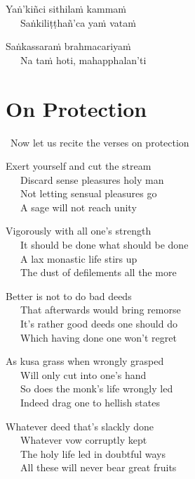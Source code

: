 \begin{hanging-indent}
Yaṅ'kiñci sithilaṁ kammaṁ\\
Saṅkiliṭṭhañ'ca yaṁ vataṁ
\end{hanging-indent}

\begin{hanging-indent}
Saṅkassaraṁ brahmacariyaṁ\\
Na taṁ hoti, mahapphalan'ti
\end{hanging-indent}

\suttaRef{[SN 2.8]}

\clearpage



\section{On Protection}
\label{tayana-gatha-english}

\begin{intro}
	\anglebracketleft\ \hspace{-0.5mm}Now let us recite the verses on protection \hspace{-0.5mm}\anglebracketright\
\end{intro}

\begin{hanging-indent}
Exert yourself and cut the stream\\
Discard sense pleasures holy man\\
Not letting sensual pleasures go\\
A sage will not reach unity
\end{hanging-indent}

\begin{hanging-indent}
Vigorously with all one's strength\\
It should be done what should be done\\
A lax monastic life stirs up\\
The dust of defilements all the more
\end{hanging-indent}

\begin{hanging-indent}
Better is not to do bad deeds\\
That afterwards would bring remorse\\
It's rather good deeds one should do\\
Which having done one won't regret
\end{hanging-indent}

\begin{hanging-indent}
As kusa grass when wrongly grasped\\
Will only cut into one's hand\\
So does the monk's life wrongly led\\
Indeed drag one to hellish states
\end{hanging-indent}

\begin{hanging-indent}
Whatever deed that's slackly done\\
Whatever vow corruptly kept\\
The holy life led in doubtful ways\\
All these will never bear great fruits
\end{hanging-indent}

\suttaRef{[SN 2.8]}

\clearpage

